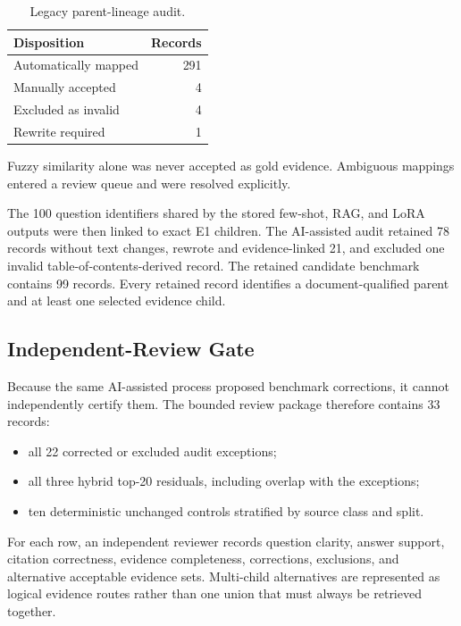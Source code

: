 \begin{table}[htbp]
  \centering
  \caption{Legacy parent-lineage audit.}
  \label{tab:legacy-lineage}
  \begin{tabular}{lr}
    \toprule
    \textbf{Disposition} & \textbf{Records} \\
    \midrule
    Automatically mapped & 291 \\
    Manually accepted & 4 \\
    Excluded as invalid & 4 \\
    Rewrite required & 1 \\
    \bottomrule
  \end{tabular}
\end{table}

Fuzzy similarity alone was never accepted as gold evidence. Ambiguous mappings entered a review queue and were resolved explicitly.

The 100 question identifiers shared by the stored few-shot, RAG, and LoRA outputs were then linked to exact E1 children. The AI-assisted audit retained 78 records without text changes, rewrote and evidence-linked 21, and excluded one invalid table-of-contents-derived record. The retained candidate benchmark contains 99 records. Every retained record identifies a document-qualified parent and at least one selected evidence child.

\subsection{Independent-Review Gate}

Because the same AI-assisted process proposed benchmark corrections, it cannot independently certify them. The bounded review package therefore contains 33 records:

\begin{itemize}
  \item all 22 corrected or excluded audit exceptions;
  \item all three hybrid top-20 residuals, including overlap with the exceptions;
  \item ten deterministic unchanged controls stratified by source class and split.
\end{itemize}

For each row, an independent reviewer records question clarity, answer support, citation correctness, evidence completeness, corrections, exclusions, and alternative acceptable evidence sets. Multi-child alternatives are represented as logical evidence routes rather than one union that must always be retrieved together.

